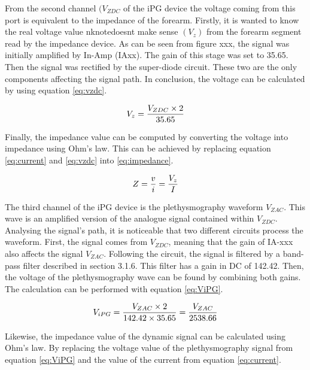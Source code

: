 From the second channel $(V_{ZDC}$ of the iPG device the voltage coming from this port is equivalent to the impedance of the forearm. Firstly, it is wanted to know the real voltage value nknote{doesnt make sense} $(V_z)$ from the forearm segment read by the impedance device. As can be seen from figure xxx, the signal was initially amplified by In-Amp (IAxx). The gain of this stage was set to 35.65. Then the signal was rectified by the super-diode circuit. These two are the only components affecting the signal path. In conclusion, the voltage can be calculated by using equation \ref{eq:vzdc}.


\begin{align}
	\label{eq:vzdc}
	V_z = \frac{V_{ZDC} \times 2}{35.65} \tagaddtext{[\si{\volt}]}
\end{align}

Finally, the impedance value can be computed by converting the voltage into impedance using Ohm's law. This can be achieved by replacing equation \ref{eq:current} and \ref{eq:vzdc} into \ref{eq:impedance}.

\begin{align}
	\label{eq:impedance}
	Z = \frac{v}{i}=\frac{V_z}{I} \tagaddtext{[\si{\ohm}]}
\end{align}

The third channel of the iPG device is the plethysmography waveform $V_{ZAC}$. This wave is an amplified version of the analogue signal contained within $V_{ZDC}$. Analysing the signal's path, it is noticeable that two different circuits process the waveform. First, the signal comes from $V_{ZDC}$, meaning that the gain of IA-xxx also affects the signal $V_{ZAC}$. Following the circuit, the signal is filtered by a band-pass filter described in section 3.1.6. This filter has a gain in DC of 142.42. Then, the voltage of the plethysmography wave can be found by combining both gains. The calculation can be performed with equation \ref{eq:ViPG}.

\begin{align}
	\label{eq:ViPG}
	V_{iPG} = \frac{V_{ZAC} \times 2}{142.42 \times 35.65}=\frac{V_{ZAC}}{2538.66} \tagaddtext{[\si{\volt}]}
\end{align}


Likewise, the impedance value of the dynamic signal can be calculated using Ohm's law. By replacing the voltage value of the plethysmography signal from equation \ref{eq:ViPG} and the value of the current from equation \ref{eq:current}.


